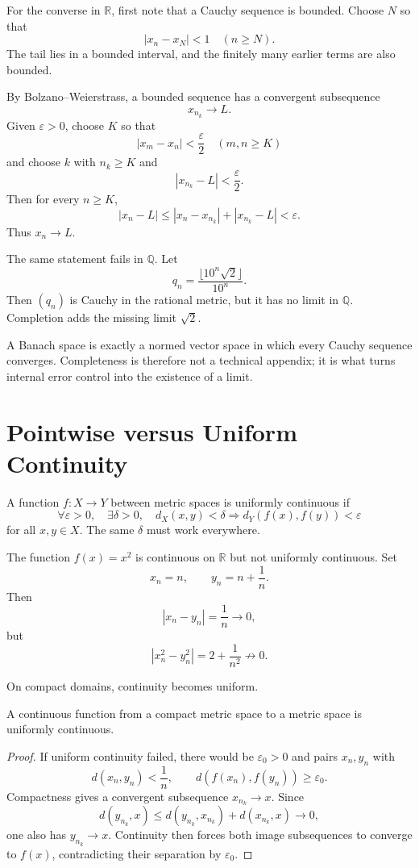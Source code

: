 For the converse in \(\mathbb R\), first note that a Cauchy sequence is bounded.  Choose \(N\) so that
\[
  |x_n-x_N|<1
  \quad(n\ge N).
\]
The tail lies in a bounded interval, and the finitely many earlier terms are also bounded.

By Bolzano--Weierstrass, a bounded sequence has a convergent subsequence
\[
  x_{n_k}\to L.
\]
Given \(\varepsilon>0\), choose \(K\) so that
\[
  |x_m-x_n|<\frac\varepsilon2
  \quad(m,n\ge K)
\]
and choose \(k\) with \(n_k\ge K\) and
\[
  |x_{n_k}-L|<\frac\varepsilon2.
\]
Then for every \(n\ge K\),
\[
  |x_n-L|
  \le|x_n-x_{n_k}|+|x_{n_k}-L|
  <\varepsilon.
\]
Thus \(x_n\to L\).

The same statement fails in \(\mathbb Q\).  Let
\[
  q_n=\frac{\lfloor10^n\sqrt2\rfloor}{10^n}.
\]
Then \((q_n)\) is Cauchy in the rational metric, but it has no limit in \(\mathbb Q\).  Completion adds the missing limit \(\sqrt2\).

A Banach space is exactly a normed vector space in which every Cauchy sequence converges.  Completeness is therefore not a technical appendix; it is what turns internal error control into the existence of a limit.

\section{Pointwise versus Uniform Continuity}

A function \(f:X\to Y\) between metric spaces is uniformly continuous if
\[
  \forall\varepsilon>0,
  \quad
  \exists\delta>0,
  \quad
  d_X(x,y)<\delta
  \Longrightarrow
  d_Y(f(x),f(y))<\varepsilon
\]
for all \(x,y\in X\).  The same \(\delta\) must work everywhere.

The function \(f(x)=x^2\) is continuous on \(\mathbb R\) but not uniformly continuous.  Set
\[
  x_n=n,
  \qquad
  y_n=n+\frac1n.
\]
Then
\[
  |x_n-y_n|=\frac1n\to0,
\]
but
\[
  |x_n^2-y_n^2|
  =2+\frac1{n^2}
  \not\to0.
\]

On compact domains, continuity becomes uniform.

\begin{theorem}
A continuous function from a compact metric space to a metric space is uniformly continuous.
\end{theorem}

\begin{proof}
If uniform continuity failed, there would be \(\varepsilon_0>0\) and pairs \(x_n,y_n\) with
\[
  d(x_n,y_n)<\frac1n,
  \qquad
  d(f(x_n),f(y_n))\ge\varepsilon_0.
\]
Compactness gives a convergent subsequence \(x_{n_k}\to x\).  Since
\[
  d(y_{n_k},x)
  \le d(y_{n_k},x_{n_k})+d(x_{n_k},x)
  \to0,
\]
one also has \(y_{n_k}\to x\).  Continuity then forces both image subsequences to converge to \(f(x)\), contradicting their separation by \(\varepsilon_0\).
\end{proof}

